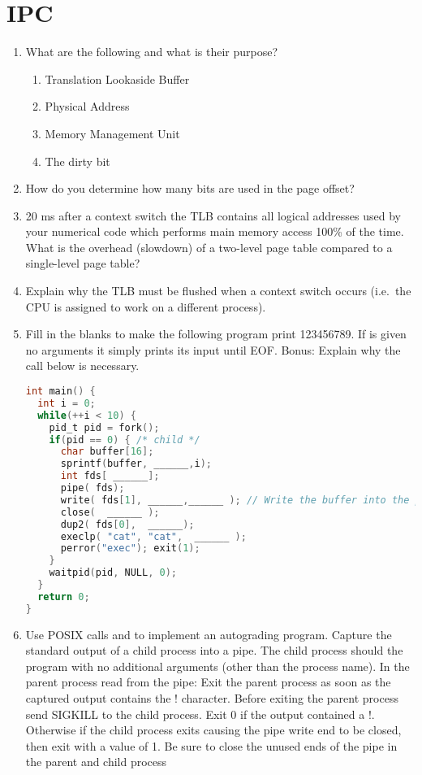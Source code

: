 \section{IPC}

\begin{enumerate}

\item What are the following and what is their purpose?
  \begin{enumerate}
  \item Translation Lookaside Buffer
  \item Physical Address
  \item Memory Management Unit
  \item The dirty bit
  \end{enumerate}

\item How do you determine how many bits are used in the page offset?

\item 20 ms after a context switch the TLB contains all logical addresses used by your numerical code which performs main memory access 100\% of the time. What is the overhead (slowdown) of a two-level page table compared to a single-level page table?

\item Explain why the TLB must be flushed when a context switch occurs (i.e.~the CPU is assigned to work on a different process).

\item Fill in the blanks to make the following program print 123456789. If  is given no arguments it simply prints its input until EOF. Bonus: Explain why the  call below is necessary.

\begin{lstlisting}[language=C]
int main() {
  int i = 0;
  while(++i < 10) {
    pid_t pid = fork();
    if(pid == 0) { /* child */
      char buffer[16];
      sprintf(buffer, ______,i);
      int fds[ ______];
      pipe( fds);
      write( fds[1], ______,______ ); // Write the buffer into the pipe
      close(  ______ );
      dup2( fds[0],  ______);
      execlp( "cat", "cat",  ______ );
      perror("exec"); exit(1);
    }
    waitpid(pid, NULL, 0);
  }
  return 0;
}
\end{lstlisting}

\item Use POSIX calls    and  to implement an autograding program. Capture the standard output of a child process into a pipe. The child process should  the program  with no additional arguments (other than the process name). In the parent process read from the pipe: Exit the parent process as soon as the captured output contains the ! character. Before exiting the parent process send SIGKILL to the child process. Exit 0 if the output contained a !. Otherwise if the child process exits causing the pipe write end to be closed, then exit with a value of 1. Be sure to close the unused ends of the pipe in the parent and child process


\end{enumerate}
